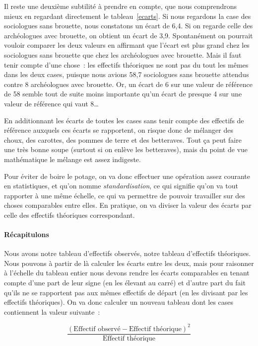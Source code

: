 \documentclass[a4paper,10pt,twoside,francais]{report}
\begin{document}
Il reste une deuxième subtilité à prendre en compte, que nous
comprendrons mieux en regardant directement le tableau~\ref{ecarts}. 
Si nous regardons la case des sociologues sans brouette, nous
constatons un écart de 6,4. Si on regarde celle des archéologues avec
brouette, on obtient un écart de 3,9. Spontanément on pourrait vouloir
comparer les deux valeurs en affirmant que l'écart est plus grand chez
les sociologues sans brouette que chez les archéologues avec
brouette. Mais il faut tenir compte d'une chose~: les effectifs
théoriques ne sont pas du tout les mêmes dans les deux cases, puisque
nous avions 58,7 sociologues sans brouette attendus contre 8
archéologues avec brouette. Or, un écart de 6 sur une valeur de
référence de 58 semble tout de suite moins importante qu'un écart de
presque 4 sur une valeur de référence qui vaut 8\ldots

En additionnant les écarts de toutes les cases sans tenir compte des
effectifs de référence auxquels ces écarts se rapportent, on risque
donc de mélanger des choux, des carottes, des pommes de terre et des
betteraves. Tout ça peut faire une très bonne soupe (surtout si on
enlève les betteraves), mais du point de vue mathématique le mélange
est assez indigeste.

Pour éviter de boire le potage, on va donc effectuer une opération
assez courante en statistiques, et qu'on nomme
\textit{standardisation}, ce qui signifie qu'on va tout rapporter à
une même échelle, ce qui va permettre de pouvoir travailler sur des
choses comparables entre elles. En pratique, on va diviser la valeur
des écarts par celle des effectifs théoriques correspondant.

\paragraph{Récapitulons} Nous avons notre tableau d'effectifs
observés, notre tableau d'effectifs théoriques. Nous pouvons à partir
de là calculer les écarts entre les deux, mais pour raisonner à
l'échelle du tableau entier nous devons rendre les écarts comparables
en tenant compte d'une part de leur signe (en les élevant au carré) et
d'autre part du fait qu'ils ne se rapportent pas aux mêmes effectifs
de départ (en les divisant par les effectifs théoriques). On va donc
calculer un nouveau tableau dont les cases contiennent la valeur
suivante~:

$$\frac{ ( \text{Effectif observé} - \text{Effectif théorique} )^2}{\text{Effectif théorique}}$$
\end{document}

